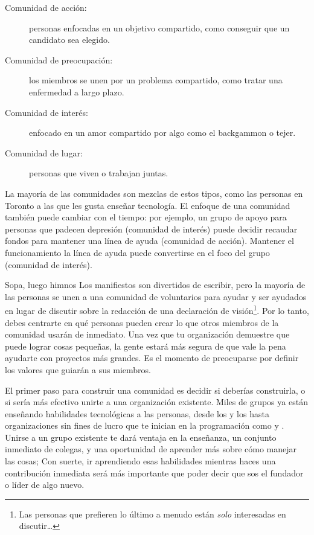 \begin{description}
\item[Comunidad de acción:]
  personas enfocadas en un objetivo compartido,
  como conseguir que un candidato sea elegido.

\item[Comunidad de preocupación:]
  los miembros se unen por un problema compartido,
  como tratar una enfermedad a largo plazo.

\item[Comunidad de interés:]
  enfocado en un amor compartido por algo como el backgammon o tejer.

\item[Comunidad de lugar:]
  personas que viven o trabajan juntas.

\end{description}
  
La mayoría de las comunidades son mezclas de estos tipos,
como las personas en Toronto a las que les gusta enseñar tecnología.
El enfoque de una comunidad también puede cambiar con el tiempo:
por ejemplo,
un grupo de apoyo para personas que padecen depresión (comunidad de interés)
puede decidir recaudar fondos para mantener una línea de ayuda (comunidad de acción).
Mantener el funcionamiento la línea de ayuda puede convertirse en el foco del grupo (comunidad de interés).

\begin{aside}{Sopa, luego himnos}
  Los manifiestos son divertidos de escribir,
  pero la mayoría de las personas se unen a una comunidad de voluntarios para ayudar y ser ayudados
  en lugar de discutir sobre la redacción de una declaración de visión\footnote{
    Las personas que prefieren lo último a menudo están \emph{solo} interesadas en discutir{\ldots}}.
  Por lo tanto, debes centrarte en
  qué personas pueden crear lo que otros miembros de la comunidad usarán de inmediato.
  Una vez que tu organización demuestre que puede lograr cosas pequeñas,
  la gente estará más segura de que vale la pena ayudarte con proyectos más grandes.
  Es el momento de preocuparse por definir los valores que guiarán a sus miembros.
\end{aside}


El primer paso para construir una comunidad es decidir si deberías construirla,
o si sería más efectivo unirte a una organización existente.
Miles de grupos ya están enseñando habilidades tecnológicas a las personas,
desde los 
y los 
hasta organizaciones sin fines de lucro que te inician en la programación como
y .
Unirse a un grupo existente te dará ventaja en la enseñanza,
un conjunto inmediato de colegas,
y una oportunidad de aprender más sobre cómo manejar las cosas;
Con suerte,
ir aprendiendo esas habilidades mientras haces una contribución inmediata
será más importante que poder decir que
sos el fundador o líder de algo nuevo.

